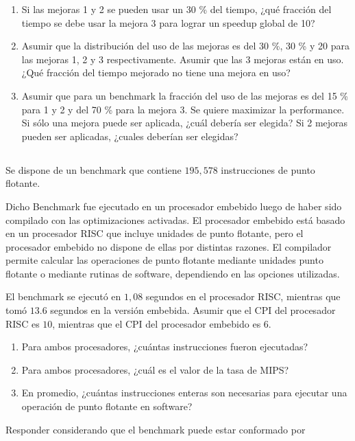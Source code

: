 \begin{enumerate}[label=\alph*)]
 \item Si las mejoras 1 y 2 se pueden usar un 30 \% del tiempo, ¿qué fracción del tiempo se debe usar la mejora 3 para lograr un speedup global de 10?
 \item Asumir que la distribución del uso de las mejoras es del 30 \%, 30 \% y 20 para las mejoras 1, 2 y 3 respectivamente. Asumir que las 3 mejoras están en uso. ¿Qué fracción del tiempo mejorado no tiene una mejora en uso?
 \item Asumir que para un benchmark la fracción del uso de las mejoras es del 15 \% para 1 y 2 y del 70 \% para la mejora 3. Se quiere maximizar la performance. Si sólo una mejora puede ser aplicada, ¿cuál debería ser elegida? Si 2 mejoras pueden ser aplicadas, ¿cuales deberían ser elegidas?
\end{enumerate}

\subsection{}
Se dispone de un benchmark que contiene $195,578$ instrucciones de punto flotante.
	
Dicho Benchmark fue ejecutado en un procesador embebido luego de haber sido compilado con las optimizaciones activadas. El procesador embebido está basado en un procesador RISC que incluye unidades de punto flotante, pero el procesador embebido no dispone de ellas por distintas razones. El compilador permite calcular las operaciones de punto flotante mediante unidades punto flotante o mediante rutinas de software, dependiendo en las opciones utilizadas.
	
El benchmark se ejecutó en $1,08$ segundos en el procesador RISC, mientras que tomó $13.6$ segundos en la versión embebida. Asumir que el CPI del procesador RISC es $10$, mientras que el CPI del procesador embebido es $6$.
	
\begin{enumerate}[label=\alph*)]
\item Para ambos procesadores, ¿cuántas instrucciones fueron ejecutadas?
\item Para ambos procesadores, ¿cuál es el valor de la tasa de MIPS?
\item En promedio, ¿cuántas instrucciones enteras son necesarias para ejecutar una operación de punto flotante en software?
\end{enumerate}
	
Responder considerando que el benchmark puede estar conformado por 
	
